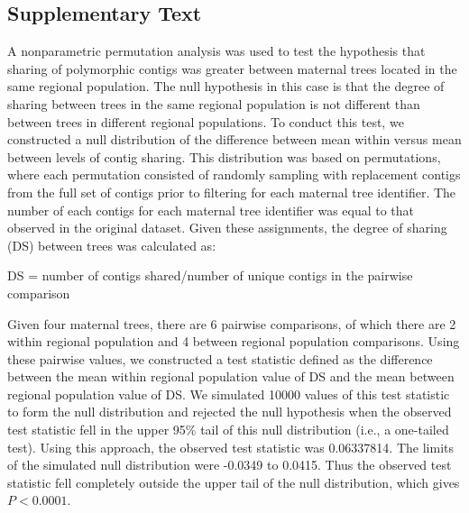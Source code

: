 \documentclass[smallextended]{svjour3}
\begin{document}
\subsection*{Supplementary Text}\label{ss:supp}

A nonparametric permutation analysis was used to test the hypothesis that
sharing of polymorphic contigs was greater between maternal trees located in the
same regional population. The null hypothesis in this case is that the degree of
sharing between trees in the same regional population is not different than
between trees in different regional populations. To conduct this test, we
constructed a null distribution of the difference between mean within versus
mean between levels of contig sharing. This distribution was based on
permutations, where each permutation consisted of randomly sampling with
replacement contigs from the full set of contigs prior to filtering for each
maternal tree identifier. The number of each contigs for each maternal tree
identifier was equal to that observed in the original dataset. Given these
assignments, the degree of sharing (DS) between trees was calculated as:

DS = number of contigs shared/number of unique contigs in the pairwise
comparison

Given four maternal trees, there are 6 pairwise comparisons, of which there are
2 within regional population and 4 between regional population
comparisons. Using these pairwise values, we constructed a test statistic
defined as the difference between the mean within regional population value of
DS and the mean between regional population value of DS. We simulated
\num{10000} values of this test statistic to form the null distribution and
rejected the null hypothesis when the observed test statistic fell in the upper
95\% tail of this null distribution (i.e., a one-tailed test). Using this
approach, the observed test statistic was 0.06337814. The limits of the
simulated null distribution were -0.0349 to 0.0415. Thus the observed test
statistic fell completely outside the upper tail of the null distribution, which
gives $P < 0.0001$.
\end{document}
